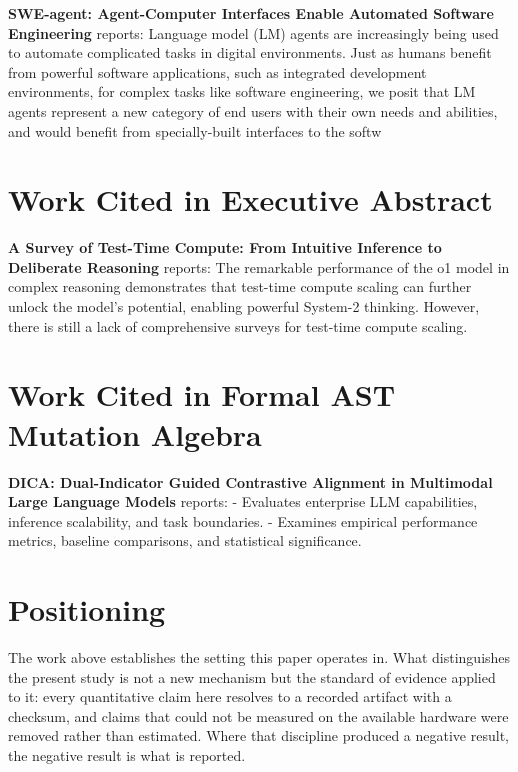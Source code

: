 \documentclass[10pt,journal,compsoc,twocolumn]{IEEEtran}
\begin{document}
\textbf{SWE-agent: Agent-Computer Interfaces Enable Automated Software Engineering} \cite{crossref_10_48550_arxiv_2405_15793} reports: Language model (LM) agents are increasingly being used to automate complicated tasks in digital environments. Just as humans benefit from powerful software applications, such as integrated development environments, for complex tasks like software engineering, we posit that LM agents represent a new category of end users with their own needs and abilities, and would benefit from specially-built interfaces to the softw


\section{Work Cited in Executive Abstract}


\textbf{A Survey of Test-Time Compute: From Intuitive Inference to Deliberate Reasoning} \cite{arxiv_2501_02497} reports: The remarkable performance of the o1 model in complex reasoning demonstrates that test-time compute scaling can further unlock the model's potential, enabling powerful System-2 thinking. However, there is still a lack of comprehensive surveys for test-time compute scaling.


\section{Work Cited in Formal AST Mutation Algebra}


\textbf{DICA: Dual-Indicator Guided Contrastive Alignment in Multimodal Large Language Models} \cite{crossref_10_18653_v1_2026_findings_acl_1933} reports: - Evaluates enterprise LLM capabilities, inference scalability, and task boundaries. - Examines empirical performance metrics, baseline comparisons, and statistical significance.


\section{Positioning}


The work above establishes the setting this paper operates in. What distinguishes the present study is not a new mechanism but the standard of evidence applied to it: every quantitative claim here resolves to a recorded artifact with a checksum, and claims that could not be measured on the available hardware were removed rather than estimated. Where that discipline produced a negative result, the negative result is what is reported.
\end{document}
